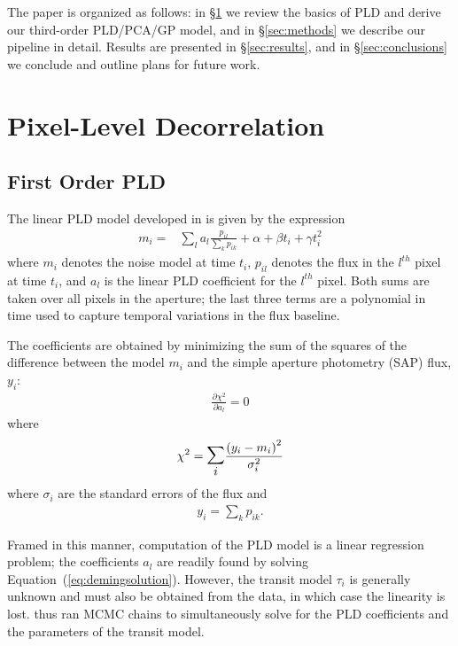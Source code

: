 \documentclass[]{emulateapj}
\begin{document}
The paper is organized as follows: in \S\ref{sec:pld} we review the basics of PLD and
derive our third-order PLD/PCA/GP model, and in \S\ref{sec:methods} we describe our pipeline
in detail. Results are presented in \S\ref{sec:results}, and in \S\ref{sec:conclusions}
we conclude and outline plans for future work.

\section{Pixel-Level Decorrelation}
\label{sec:pld}
\subsection{First Order PLD}
\label{sec:firstorder}
The linear PLD model developed in \cite{DEM15} is given by the expression
\begin{align}
\label{eq:demingmodel}
m_i = &\sum\limits_{l}a_l\frac{p_{il}}{\sum\limits_{k}p_{ik}} + \alpha + \beta t_i + \gamma t_i^2
\end{align}
where $m_i$ denotes the noise model at time $t_i$,
$p_{il}$ denotes the flux in the $l^{th}$ pixel at time $t_i$, and $a_l$ is
the linear PLD coefficient for the $l^{th}$ pixel. Both sums are taken over
all pixels in the aperture; the last three terms are a polynomial in time used
to capture temporal variations in the flux baseline.

The coefficients are obtained by minimizing the sum of the squares of the difference
between the model $m_i$ and the simple aperture photometry (SAP) flux, $y_i$:
\begin{align}
\label{eq:demingsolution}
\frac{\partial \chi^2}{\partial a_l} = 0
\end{align}
where
\begin{align}
\label{eq:demingchisq}
\chi^2 = \mathlarger{\mathlarger{\sum\limits_{i}}}\frac{\left(y_i - m_i\right)^2}{\sigma_i^2}
\end{align}
where $\sigma_i$ are the standard errors of the flux and
\begin{align}
\label{eq:demingsap}
y_i = \sum\limits_{k}p_{ik}.
\end{align}

Framed in this manner, computation of the PLD model is a linear regression problem; the
coefficients $a_l$ are readily found by solving Equation~(\ref{eq:demingsolution}).
However, the transit model $\tau_i$ is generally unknown and must also be obtained from
the data, in which case the linearity is lost. \cite{DEM15} thus ran MCMC chains to
simultaneously solve for the PLD coefficients and the parameters of the transit model.
\end{document}
